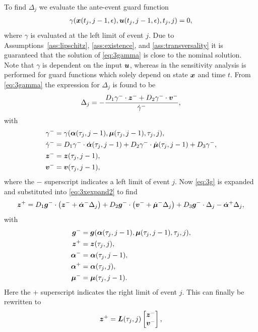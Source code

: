 \documentclass[../DC2017114Bouma.tex]{subfiles}
\begin{document}
To find $\Delta_{j}$ we evaluate the ante-event guard function
\begin{align}
\gamma({\boldsymbol{x}}(t_{j},j-1,\epsilon),{\boldsymbol{u}}(t_{j},j-1,\epsilon),t_{j},j) = 0,\label{eq:3gamma}
\end{align}
where $\gamma$ is evaluated at the left limit of event $j$. Due to Assumptions~\ref{ass:lipschitz}, \ref{ass:existence}, and \ref{ass:transversality} it is guaranteed that the solution of \eqref{eq:3gamma} is close to the nominal solution. Note that $\gamma$ is dependent on the input ${\boldsymbol{u}}$, whereas in \cite{Chen2018a} the sensitivity analysis is performed for guard functions which solely depend on state ${\boldsymbol{x}}$ and time $t$. From \eqref{eq:3gamma} the expression for $\Delta_{j}$ is found to be
\begin{align}
\Delta_{j} = -\frac{D_1\gamma^{-}\cdot{\boldsymbol{z}}^- + D_2\gamma^{-}\cdot{\boldsymbol{v}}^-}{\dot{\gamma}^{-}},\label{eq}
\end{align}
with
\begin{align}
\gamma^- &= \gamma(\boldsymbol{\alpha}(\tau_j,j-1),\boldsymbol{\mu}(\tau_j,j-1),\tau_j,j),\\
\dot{\gamma}^- &= D_1\gamma^-\cdot\dot{\boldsymbol{\alpha}}(\tau_j,j-1) + D_2\gamma^-\cdot\dot{\boldsymbol{\mu}}(\tau_j,j-1) + D_3\gamma^-,\\
{\boldsymbol{z}}^- &= {\boldsymbol{z}}(\tau_j,j-1),\\
{\boldsymbol{v}}^- &= {\boldsymbol{v}}(\tau_j,j-1),
\end{align}
where the $-$ superscript indicates a left limit of event $j$. Now \eqref{eq:3g} is expanded and substituted  into \eqref{eq:3xexpand2} to find
\begin{equation}
{\boldsymbol{z}}^+ = D_1{\boldsymbol{g}}^-\cdot\left({\boldsymbol{z}}^- + \dot{\boldsymbol{\alpha}}^-\Delta_j\right) + D_2{\boldsymbol{g}}^-\cdot\left({\boldsymbol{v}}^- + \dot{\boldsymbol{\mu}}^-\Delta_j\right) + D_3{\boldsymbol{g}}^-\cdot\Delta_j - \dot{\boldsymbol{\alpha}}^+\Delta_j,
\end{equation}
with
\begin{align}
{\boldsymbol{g}}^- &= {\boldsymbol{g}}(\boldsymbol{\alpha}(\tau_j,j-1),\boldsymbol{\mu}(\tau_j,j-1),\tau_j,j),\\
{\boldsymbol{z}}^+ &= {\boldsymbol{z}}(\tau_j,j),\\
\boldsymbol{\alpha}^- &= \boldsymbol{\alpha}(\tau_j,j-1),\\
\boldsymbol{\alpha}^+ &= \boldsymbol{\alpha}(\tau_j,j),\\
\boldsymbol{\mu}^- &= \boldsymbol{\mu}(\tau_j,j-1).
\end{align}
Here the $+$ superscript indicates the right limit of event $j$. This can finally be rewritten to
\begin{align}
{\boldsymbol{z}}^+ = {\boldsymbol{L}}(\tau_j,j)\begin{bmatrix}
{\boldsymbol{z}}^- \\ {\boldsymbol{v}}^-
\end{bmatrix},
\end{align}
\end{document}
